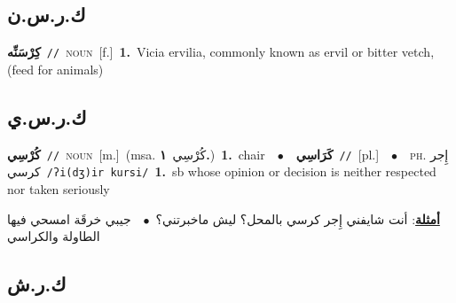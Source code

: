 \documentclass[10pt,a4paper,twoside]{article} %
\begin{document}
\begin{multicols}{2}
\vspace{-3mm}
\subsection*{\color{blue}\foreignlanguage{arabic}{ك.ر.س.ن}\color{blue}{}} 

{\setlength\topsep{0pt}\textbf{\foreignlanguage{arabic}{كِرْسَنِّه}}\ {\color{gray}\texttt{//}\color{black}}\ \textsc{noun}\ [f.]\ \textbf{1.}~Vicia ervilia, commonly known as ervil or bitter vetch, (feed for animals)\ } \vspace{2mm}

\vspace{-3mm}
\subsection*{\color{blue}\foreignlanguage{arabic}{ك.ر.س.ي}\color{blue}{}} 

{\setlength\topsep{0pt}\textbf{\foreignlanguage{arabic}{كُرْسِي}}\ {\color{gray}\texttt{//}\color{black}}\ \textsc{noun}\ [m.]\ \color{gray}(msa. \foreignlanguage{arabic}{كُرْسِي}~\foreignlanguage{arabic}{\textbf{١.}})\color{black}\ \textbf{1.}~chair\ \ $\bullet$\ \ \setlength\topsep{0pt}\textbf{\foreignlanguage{arabic}{كَرَاسِي}}\ {\color{gray}\texttt{//}\color{black}}\ [pl.]\ \ $\bullet$\ \ \textsc{ph.} \color{gray} \foreignlanguage{arabic}{إِجر كرسي}\color{black}\ {\color{gray}\texttt{/{\sffamily ʔi(dʒ)ir kursi}/}\color{black}}\ \textbf{1.}~sb whose opinion or decision is neither respected nor taken seriously\  \begin{flushright}\color{gray}\foreignlanguage{arabic}{\textbf{\underline{\foreignlanguage{arabic}{أمثلة}}}: أنت شايفني إِجر كرسي بالمحل؟ ليش ماخبرتني؟\ $\bullet$\ \  جيبي خرقَة امسحي فيها الطاولة والكراسي}\end{flushright}\color{black}} \vspace{2mm}

\vspace{-3mm}
\subsection*{\color{blue}\foreignlanguage{arabic}{ك.ر.ش}\color{blue}{}} 


\end{multicols}
\end{document}
